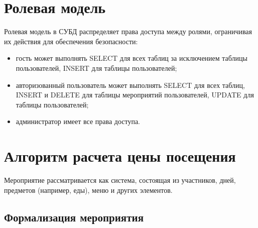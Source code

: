 \section{Ролевая модель}

Ролевая модель в СУБД распределяет права доступа между ролями, ограничивая их действия для обеспечения безопасности:
\begin{itemize}[label=--]
	\item гость может выполнять SELECT для всех таблиц за исключением таблицы пользователей, INSERT для таблицы пользователей;
	\item авторизованный пользователь может выполнять SELECT для всех таблиц, INSERT и DELETE для таблицы мероприятий пользователей, UPDATE для таблицы пользователей;
	\item администратор имеет все права доступа.
\end{itemize}

\section{Алгоритм расчета цены посещения}

Мероприятие рассматривается как система, состоящая из участников, дней, предметов (например, еды), меню и других элементов. 

\subsection{Формализация мероприятия}

